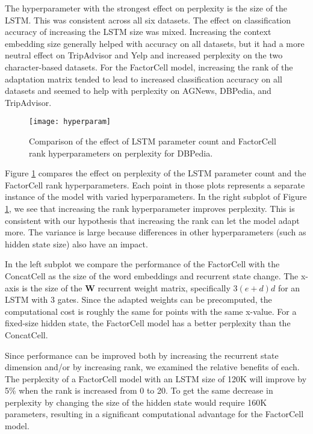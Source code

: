 The hyperparameter with the strongest effect on perplexity is the size of the LSTM. This was consistent across all six datasets. The effect on classification accuracy of increasing the LSTM size was mixed. Increasing the context embedding size generally helped with accuracy on all datasets, but it had a more neutral effect on TripAdvisor and Yelp and increased perplexity on the two character-based datasets. For the FactorCell model, increasing the rank of the adaptation matrix tended to lead to increased classification accuracy on all datasets and seemed to help with perplexity on AGNews, DBPedia, and TripAdvisor. 

\begin{figure}[h]
\centering
\texttt{[image: hyperparam]}
\caption{Comparison of the effect of LSTM parameter count and FactorCell rank hyperparameters on perplexity for DBPedia.}
\label{fig:rank}
\end{figure}

Figure \ref{fig:rank} compares the effect on perplexity of the LSTM parameter count and the FactorCell rank hyperparameters. Each point in those plots represents a separate instance of the model with varied hyperparameters. In the right subplot of Figure \ref{fig:rank}, we see that increasing the rank hyperparameter improves perplexity. This is consistent with our hypothesis that increasing the rank can let the model adapt more. The variance is large because differences in other hyperparameters (such as hidden state size) also have an impact.

In the left subplot we compare the performance of the FactorCell with the ConcatCell as the size of the word embeddings and recurrent state change. The x-axis is the size of the $\mathbf{W}$ recurrent weight matrix, specifically $3 (e + d) d$ for an LSTM with $3$ gates. Since the adapted weights can be precomputed, the computational cost is roughly the same for points with the same x-value. For a fixed-size hidden state, the FactorCell model has a better perplexity than the ConcatCell. 

Since performance can be improved both by increasing the recurrent state dimension and/or by increasing rank, we examined the relative benefits of each. The perplexity of a FactorCell model with an LSTM size of 120K will improve by 5\% when the rank is increased from 0 to 20. To get the same decrease in perplexity by changing the size of the hidden state would require 160K parameters, resulting in a significant computational advantage for the FactorCell model.

